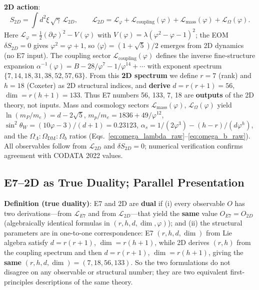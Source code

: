 \documentclass[11pt,a4paper]{article}
\begin{document}
\textbf{2D action}:
\begin{equation}
S_{2D} = \int d^2\xi\,\sqrt{\gamma}\,\mathcal{L}_{2D}, \qquad
\mathcal{L}_{2D} = \mathcal{L}_\varphi + \mathcal{L}_{\text{coupling}}(\varphi) + \mathcal{L}_{\text{mass}}(\varphi) + \mathcal{L}_\Omega(\varphi).
\end{equation}
Here $\mathcal{L}_\varphi = \tfrac{1}{2}(\partial\varphi)^2 - V(\varphi)$ with $V(\varphi) = \lambda(\varphi^2 - \varphi - 1)^2$; the EOM $\delta S_{2D}=0$ gives $\varphi^2 = \varphi + 1$, so $\langle\varphi\rangle = (1+\sqrt{5})/2$ emerges from 2D dynamics (no E7 input). The coupling sector $\mathcal{L}_{\text{coupling}}(\varphi)$ defines the inverse fine-structure expansion $\alpha^{-1}(\varphi) = B - 28/\varphi^7 - 1/\varphi^{14} + \cdots$ with exponent spectrum $\{7,14,18,31,38,52,57,63\}$. From this \textbf{2D spectrum} we define $r=7$ (rank) and $h=18$ (Coxeter) as 2D structural indices, and \textbf{derive} $d = r(r+1) = 56$, $\dim = r(h+1) = 133$. Thus E7 numbers 56, 133, 7, 18 are \textbf{outputs} of the 2D theory, not inputs. Mass and cosmology sectors $\mathcal{L}_{\text{mass}}(\varphi)$, $\mathcal{L}_\Omega(\varphi)$ yield $\ln(m_P/m_e) = d - 2\sqrt{5}$, $m_p/m_e = 1836 + 49/\varphi^{12}$, $\sin^2\theta_W = (10\varphi - 3)/(d+1) = 0.23123$, $\alpha_s = 1/(2\varphi^3) - (h{-}r)/(d\varphi^h)$, and the $\Omega_\Lambda:\Omega_{\text{DM}}:\Omega_b$ ratios (Eqs.~\ref{eq:omega_lambda_raw}--\ref{eq:omega_b_raw}). All observables follow from $\mathcal{L}_{2D}$ and $\delta S_{2D}=0$; numerical verification confirms agreement with CODATA 2022 values.

\subsection{E7--2D as True Duality; Parallel Presentation}
\label{sec:e7-2d-true-duality}

\textbf{Definition (true duality)}: E7 and 2D are \textbf{dual} if (i) every observable $O$ has two derivations---from $\mathcal{L}_{E7}$ and from $\mathcal{L}_{2D}$---that yield the \textbf{same} value $O_{E7} = O_{2D}$ (algebraically identical formulas in $(r,h,d,\dim,\varphi)$); and (ii) the structural parameters are in one-to-one correspondence: E7 $(r,h,d,\dim)$ from Lie algebra satisfy $d=r(r+1)$, $\dim=r(h+1)$, while 2D derives $(r,h)$ from the coupling spectrum and then $d = r(r+1)$, $\dim = r(h+1)$, giving the \textbf{same} $(r,h,d,\dim) = (7,18,56,133)$. So the two formulations do not disagree on any observable or structural number; they are two equivalent first-principles descriptions of the same theory.
\end{document}
